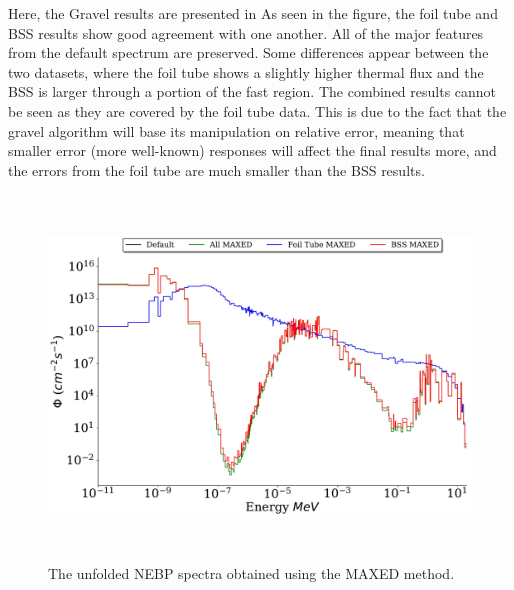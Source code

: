 Here, the Gravel results are presented in 
As seen in the figure, the foil tube and BSS results show good agreement with one another.
All of the major features from the default spectrum are preserved.
Some differences appear between the two datasets, where the foil tube shows a slightly higher thermal flux and the BSS is larger through a portion of the fast region.
The combined results cannot be seen as they are covered by the foil tube data.
This is due to the fact that the gravel algorithm will base its manipulation on relative error, meaning that smaller error (more well-known) responses will affect the final results more, and the errors from the foil tube are much smaller than the BSS results.

\begin{figure}[htb]
\includegraphics[height=3.8in]{tex/figures/unfolded_mx.pdf}
\caption[MAXED Unfolded Spectra]{The unfolded NEBP spectra obtained using the MAXED method.}
\label{fig:unfolded_mx}
\end{figure}

